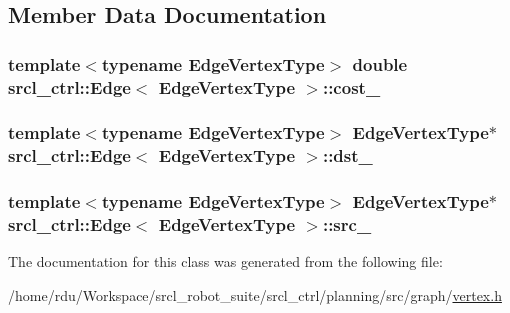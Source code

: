 \subsection{Member Data Documentation}
\hypertarget{classsrcl__ctrl_1_1Edge_a7371601eee959a3b670aa6417484b871}{
\subsubsection[{cost\-\_\-}]{\setlength{\rightskip}{0pt plus 5cm}template$<$typename Edge\-Vertex\-Type$>$ double {\bf srcl\-\_\-ctrl\-::\-Edge}$<$ Edge\-Vertex\-Type $>$\-::cost\-\_\-}}\label{classsrcl__ctrl_1_1Edge_a7371601eee959a3b670aa6417484b871}
\hypertarget{classsrcl__ctrl_1_1Edge_a4056e34b3a064ff9a9b911403c6ea2fc}{
\subsubsection[{dst\-\_\-}]{\setlength{\rightskip}{0pt plus 5cm}template$<$typename Edge\-Vertex\-Type$>$ Edge\-Vertex\-Type$\ast$ {\bf srcl\-\_\-ctrl\-::\-Edge}$<$ Edge\-Vertex\-Type $>$\-::dst\-\_\-}}\label{classsrcl__ctrl_1_1Edge_a4056e34b3a064ff9a9b911403c6ea2fc}
\hypertarget{classsrcl__ctrl_1_1Edge_a5bed55147bff722c87024125ce1f9342}{
\subsubsection[{src\-\_\-}]{\setlength{\rightskip}{0pt plus 5cm}template$<$typename Edge\-Vertex\-Type$>$ Edge\-Vertex\-Type$\ast$ {\bf srcl\-\_\-ctrl\-::\-Edge}$<$ Edge\-Vertex\-Type $>$\-::src\-\_\-}}\label{classsrcl__ctrl_1_1Edge_a5bed55147bff722c87024125ce1f9342}


The documentation for this class was generated from the following file\-:\begin{DoxyCompactItemize}
\item 
/home/rdu/\-Workspace/srcl\-\_\-robot\-\_\-suite/srcl\-\_\-ctrl/planning/src/graph/\hyperlink{vertex_8h}{vertex.\-h}\end{DoxyCompactItemize}
